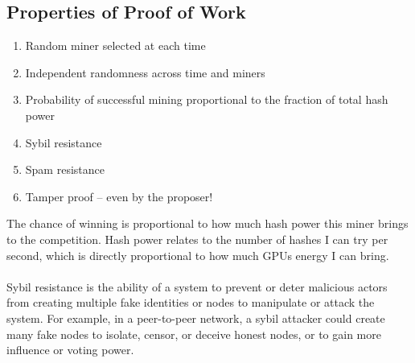 \subsection*{Properties of Proof of Work}
\begin{enumerate}
    \item Random miner selected at each time
    \item Independent randomness across time and miners
    \item Probability of successful mining proportional to the fraction of total hash power
    \item Sybil resistance
    \item Spam resistance
    \item Tamper proof – even by the proposer!
\end{enumerate}
The chance of winning is proportional to how much hash power this miner brings to the competition. Hash power relates to the number of hashes I can try per second, which is directly proportional to how much GPUs energy I can bring.\\\\
Sybil resistance is the ability of a system to prevent or deter malicious actors from creating multiple fake identities or nodes to manipulate or attack the system. For example, in a peer-to-peer network, a sybil attacker could create many fake nodes to isolate, censor, or deceive honest nodes, or to gain more influence or voting power.
